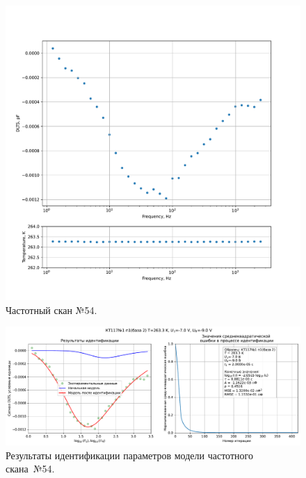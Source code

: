 \begin{figure}[!ht]
    \centering
    \includegraphics[width=1\textwidth]{../plots/КТ117№1_п1(база 2)_2500Гц-1Гц_1пФ_-10С_-7В-9В_50мВ_20мкс_шаг_0,1.pdf}
    \caption{Частотный скан №54.}
    \label{pic:frequency_scan_54}
\end{figure}

\begin{figure}[!ht]
    \centering
    \includegraphics[width=1\textwidth]{../plots/КТ117№1_п1(база 2)_2500Гц-1Гц_1пФ_-10С_-7В-9В_50мВ_20мкс_шаг_0,1_model.pdf}
    \caption{Результаты идентификации параметров модели частотного скана~№54.}
    \label{pic:frequency_scan_model54}
\end{figure}

\pagebreak


